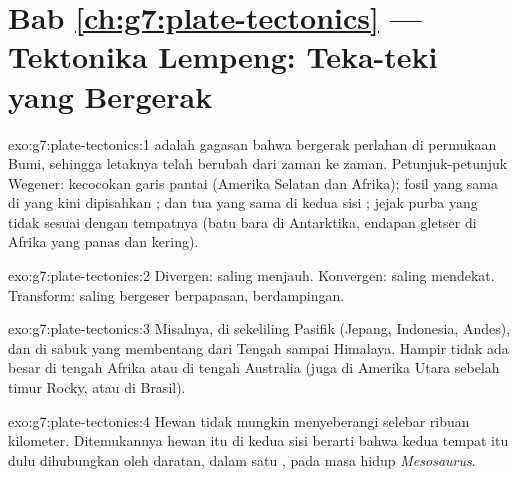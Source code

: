 \section*{Bab \ref{ch:g7:plate-tectonics} --- Tektonika Lempeng: Teka-teki yang Bergerak}

\begin{solution}{exo:g7:plate-tectonics:1}
 adalah gagasan bahwa  bergerak perlahan di
permukaan Bumi, sehingga letaknya telah berubah dari zaman ke zaman.
Petunjuk-petunjuk Wegener: kecocokan garis pantai (Amerika Selatan dan
Afrika); fosil yang sama di  yang kini dipisahkan ;
 dan  tua yang sama di kedua sisi ; jejak  purba
yang tidak sesuai dengan tempatnya (batu bara di Antarktika, endapan gletser
di Afrika yang panas dan kering).
\end{solution}

\begin{solution}{exo:g7:plate-tectonics:2}
Divergen:  saling menjauh. Konvergen:  saling
mendekat. Transform:  saling bergeser berpapasan, berdampingan.
\end{solution}

\begin{solution}{exo:g7:plate-tectonics:3}
Misalnya, di sekeliling  Pasifik (Jepang, Indonesia, 
Andes), dan di sabuk yang membentang dari  Tengah sampai Himalaya.
Hampir tidak ada  besar di tengah Afrika atau di tengah Australia
(juga di Amerika Utara sebelah timur  Rocky, atau di Brasil).
\end{solution}

\begin{solution}{exo:g7:plate-tectonics:4}
Hewan  tidak mungkin menyeberangi   selebar ribuan
kilometer. Ditemukannya hewan itu di kedua sisi berarti bahwa kedua tempat
itu dulu dihubungkan oleh daratan, dalam satu , pada masa hidup
\emph{Mesosaurus}.
\end{solution}

